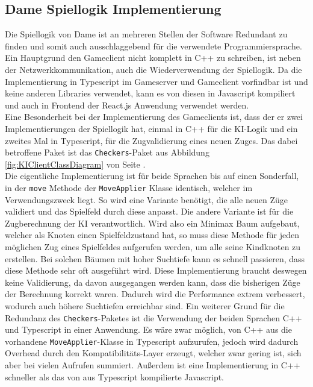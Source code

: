 \documentclass[12pt,a4paper,bibliography=totocnumbered,listof=totocnumbered]{article}
\begin{document}
\subsection{Dame Spiellogik Implementierung}
Die Spiellogik von Dame ist an mehreren Stellen der Software Redundant zu finden und somit auch ausschlaggebend für die verwendete Programmiersprache.
Ein Hauptgrund den Gameclient nicht komplett in C++ zu schreiben, ist neben der Netzwerkkommunikation, auch die Wiederverwendung der Spiellogik.
Da die Implementierung in Typescript im Gameserver und Gameclient vorfindbar ist und keine anderen Libraries verwendet, kann es von diesen in Javascript kompiliert 
und auch in Frontend der React.js Anwendung verwendet werden.
\\
Eine Besonderheit bei der Implementierung des Gameclients ist, dass der er zwei Implementierungen der Spiellogik hat, 
einmal in C++ für die KI-Logik und ein zweites Mal in Typescript, für die Zugvalidierung eines neuen Zuges. 
Das dabei betroffene Paket ist das \texttt{Checkers}-Paket aus Abbildung \ref{fig:KIClientClassDiagram} von Seite \pageref{fig:KIClientClassDiagram}. 
\\
Die eigentliche Implementierung ist für beide Sprachen bis auf einen Sonderfall, in der \texttt{move} Methode der \texttt{MoveApplier} Klasse identisch, 
welcher im Verwendungszweck liegt. So wird eine Variante benötigt, die alle neuen Züge validiert und das Spielfeld durch diese anpasst. Die andere Variante ist für 
die Zugberechnung der KI verantwortlich. Wird also ein Minimax Baum aufgebaut, welcher als Knoten einen Spielfeldzustand hat, so muss diese Methode für jeden möglichen Zug eines 
Spielfeldes aufgerufen werden, um alle seine Kindknoten zu erstellen. Bei solchen Bäumen mit hoher Suchtiefe kann es schnell passieren, 
dass diese Methode sehr oft ausgeführt wird. Diese Implementierung braucht deswegen keine Validierung, da davon ausgegangen werden kann, dass die bisherigen Züge der 
Berechnung korrekt waren. Dadurch wird die Performance extrem verbessert, wodurch auch höhere Suchtiefen erreichbar sind.
Ein weiterer Grund für die Redundanz des \texttt{Checkers}-Paketes ist die Verwendung der beiden Sprachen C++ und Typescript in einer Anwendung. 
Es wäre zwar möglich, von C++ aus die vorhandene \texttt{MoveApplier}-Klasse in Typescript aufzurufen, jedoch wird dadurch Overhead durch den Kompatibilitäts-Layer erzeugt,
welcher zwar gering ist, sich aber bei vielen Aufrufen summiert. Außerdem ist eine Implementierung in C++ schneller als das von aus Typescript kompilierte Javascript.
\end{document}
